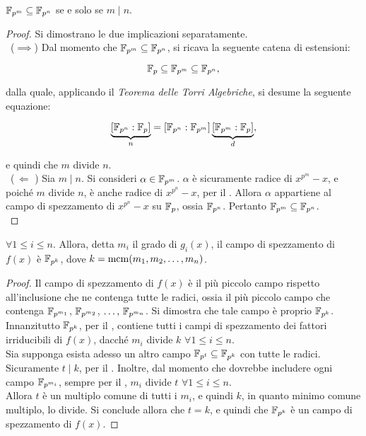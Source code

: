 \begin{theorem}
    \label{th:inclusione}
    $\mathbb{F}_{p^m} \subseteq \mathbb{F}_{p^n}$ se e solo se $m \mid n$.
\end{theorem}

\begin{proof}
    Si dimostrano le due implicazioni separatamente. \\

    \ ($\implies$)\; Dal momento che $\mathbb{F}_{p^m} \subseteq \mathbb{F}_{p^n}$,
    si ricava la seguente catena di estensioni:

    \[ \mathbb{F}_p \subseteq \mathbb{F}_{p^m} \subseteq \mathbb{F}_{p^n}, \]

    \vskip 0.1in

    dalla quale, applicando il \textit{Teorema delle Torri Algebriche},
    si desume la seguente equazione:

    \[ \underbrace{[\mathbb{F}_{p^n} : \mathbb{F}_p]}_n = [\mathbb{F}_{p^n} : \mathbb{F}_{p^m}] \underbrace{[\mathbb{F}_{p^m} : \mathbb{F}_p]}_d, \]

    e quindi che $m$ divide $n$. \\

    \ ($\,\Longleftarrow\,\,$)\; Sia $m \mid n$. Si consideri $\alpha \in \mathbb{F}_{p^m}$. $\alpha$
    è sicuramente radice di $x^{p^m}-x$, e poiché $m$ divide $n$, è
    anche radice di $x^{p^n}-x$, per il . Allora
    $\alpha$ appartiene al campo di spezzamento di $x^{p^n}-x$ su $\mathbb{F}_p$,
    ossia $\mathbb{F}_{p^n}$. Pertanto $\mathbb{F}_{p^m} \subseteq \mathbb{F}_{p^n}$. \\
\end{proof}

\begin{corollary}
    $\forall 1 \leq i \leq n$. Allora, detta $m_i$ il grado di $g_i(x)$, il
    campo di spezzamento di $f(x)$ è $\mathbb{F}_{p^{k}}$, dove $k = \operatorname{mcm}(m_1, m_2, \ldots, m_n)$.
\end{corollary}

\begin{proof}
    Il campo di spezzamento di $f(x)$ è il più piccolo campo rispetto all'inclusione
    che ne contenga tutte le radici, ossia il più piccolo campo che contenga
    $\mathbb{F}_{p^{m_1}}$, $\mathbb{F}_{p^{m_2}}$, $\ldots,\, \mathbb{F}_{p^{m_n}}$. Si dimostra che tale campo
    è proprio $\mathbb{F}_{p^{k}}$. \\

    Innanzitutto $\mathbb{F}_{p^{k}}$, per il , contiene tutti i campi di spezzamento dei fattori irriducibili di $f(x)$, dacché $m_i$ divide $k$ $\forall 1 \leq i \leq n$. \\

    Sia supponga esista adesso un altro campo $\mathbb{F}_{p^{t}} \subseteq \mathbb{F}_{p^{k}}$ con tutte le
    radici. Sicuramente $t \mid k$, per il . Inoltre, dal momento
    che dovrebbe includere ogni campo $\mathbb{F}_{p^{m_i}}$, sempre per il ,
    $m_i$ divide $t$ $\forall 1 \leq i \leq n$. \\

    Allora $t$ è un multiplo comune di tutti i $m_i$, e quindi $k$, in quanto minimo
    comune multiplo, lo divide. Si conclude allora che $t = k$, e quindi che
    $\mathbb{F}_{p^{k}}$ è un campo di spezzamento di $f(x)$.
\end{proof}

